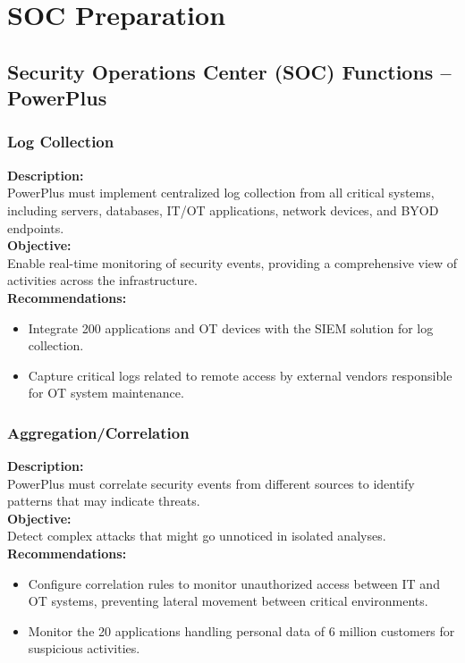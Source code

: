\chapter{SOC Preparation}

\section*{Security Operations Center (SOC) Functions – PowerPlus}

\subsection*{ Log Collection}
\textbf{Description:} \\
PowerPlus must implement centralized log collection from all critical systems, including servers, databases, IT/OT applications, network devices, and BYOD endpoints. \\

\textbf{Objective:} \\
Enable real-time monitoring of security events, providing a comprehensive view of activities across the infrastructure. \\

\textbf{Recommendations:}
\begin{itemize}
    \item Integrate 200 applications and OT devices with the SIEM solution for log collection.
    \item Capture critical logs related to remote access by external vendors responsible for OT system maintenance.
\end{itemize}

\subsection*{ Aggregation/Correlation}
\textbf{Description:} \\
PowerPlus must correlate security events from different sources to identify patterns that may indicate threats. \\

\textbf{Objective:} \\
Detect complex attacks that might go unnoticed in isolated analyses. \\

\textbf{Recommendations:}
\begin{itemize}
    \item Configure correlation rules to monitor unauthorized access between IT and OT systems, preventing lateral movement between critical environments.
    \item Monitor the 20 applications handling personal data of 6 million customers for suspicious activities.
\end{itemize}

